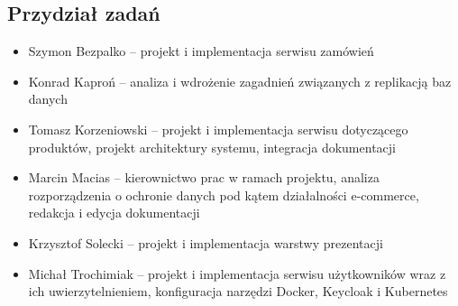 \documentclass[11pt,a4paper,twoside]{article}
\begin{document}
\subsection{Przydział zadań}
\begin{itemize}
\item Szymon Bezpalko -- projekt i implementacja serwisu zamówień
\item Konrad Kaproń -- analiza i wdrożenie zagadnień związanych z replikacją baz danych
\item Tomasz Korzeniowski -- projekt i implementacja serwisu dotyczącego produktów, projekt architektury systemu, integracja dokumentacji
\item Marcin Macias -- kierownictwo prac w ramach projektu,  analiza rozporządzenia o ochronie danych pod kątem działalności e-commerce, redakcja i edycja dokumentacji
\item Krzysztof Solecki -- projekt i implementacja warstwy prezentacji
\item Michał Trochimiak -- projekt i implementacja serwisu użytkowników wraz z ich uwierzytelnieniem, konfiguracja narzędzi Docker, Keycloak i Kubernetes

\end{itemize}








\end{document}
